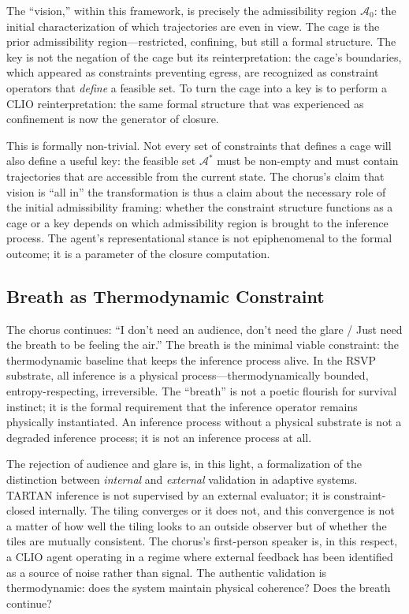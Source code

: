 \documentclass[12pt, a4paper]{article}
\begin{document}
The ``vision,'' within this framework, is precisely the admissibility region $\mathcal{A}_0$: the initial characterization of which trajectories are even in view. The cage is the prior admissibility region---restricted, confining, but still a formal structure. The key is not the negation of the cage but its reinterpretation: the cage's boundaries, which appeared as constraints preventing egress, are recognized as constraint operators that \textit{define} a feasible set. To turn the cage into a key is to perform a CLIO reinterpretation: the same formal structure that was experienced as confinement is now the generator of closure.

This is formally non-trivial. Not every set of constraints that defines a cage will also define a useful key: the feasible set $\mathcal{A}^*$ must be non-empty and must contain trajectories that are accessible from the current state. The chorus's claim that vision is ``all in'' the transformation is thus a claim about the necessary role of the initial admissibility framing: whether the constraint structure functions as a cage or a key depends on which admissibility region is brought to the inference process. The agent's representational stance is not epiphenomenal to the formal outcome; it is a parameter of the closure computation.

\subsection{Breath as Thermodynamic Constraint}

The chorus continues: ``I don't need an audience, don't need the glare / Just need the breath to be feeling the air.'' The breath is the minimal viable constraint: the thermodynamic baseline that keeps the inference process alive. In the RSVP substrate, all inference is a physical process---thermodynamically bounded, entropy-respecting, irreversible. The ``breath'' is not a poetic flourish for survival instinct; it is the formal requirement that the inference operator remains physically instantiated. An inference process without a physical substrate is not a degraded inference process; it is not an inference process at all.

The rejection of audience and glare is, in this light, a formalization of the distinction between \textit{internal} and \textit{external} validation in adaptive systems. TARTAN inference is not supervised by an external evaluator; it is constraint-closed internally. The tiling converges or it does not, and this convergence is not a matter of how well the tiling looks to an outside observer but of whether the tiles are mutually consistent. The chorus's first-person speaker is, in this respect, a CLIO agent operating in a regime where external feedback has been identified as a source of noise rather than signal. The authentic validation is thermodynamic: does the system maintain physical coherence? Does the breath continue?
\end{document}
